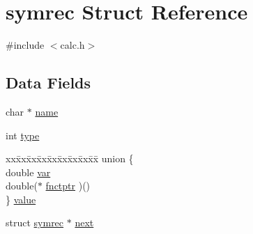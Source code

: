 \hypertarget{structsymrec}{\section{symrec Struct Reference}
\label{structsymrec}
}


{\ttfamily \#include $<$calc.\+h$>$}

\subsection*{Data Fields}
\begin{DoxyCompactItemize}
\item 
char $\ast$ \hyperlink{structsymrec_a13b3ddedd56ed8a393dfd4b266bb81e1}{name}
\item 
int \hyperlink{structsymrec_a3ed0bae32ad0e16423a49153484094f8}{type}
\item 
\begin{tabbing}
xx\=xx\=xx\=xx\=xx\=xx\=xx\=xx\=xx\=\kill
union \{\\
\>double \hyperlink{structsymrec_af3db0c7e569f93a9d7385d5b170578f8}{var}\\
\>double($\ast$ \hyperlink{structsymrec_a841939294a168dadc7dc230596f932ca}{fnctptr} )()\\
\} \hyperlink{structsymrec_aabe0b508928c6472fcbdf5071c33b61a}{value}\\

\end{tabbing}\item 
struct \hyperlink{structsymrec}{symrec} $\ast$ \hyperlink{structsymrec_a799aa9b5b3ee76aa0634b0ad96f80ea1}{next}
\end{DoxyCompactItemize}


